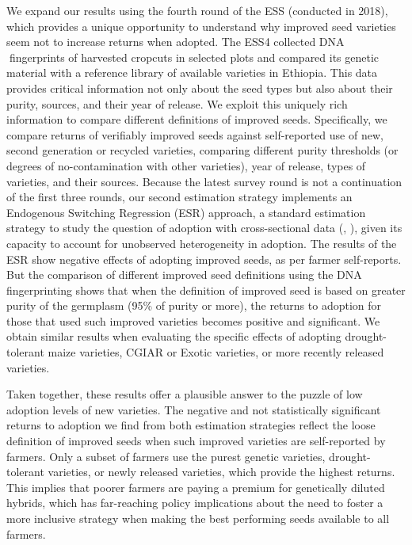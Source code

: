 \documentclass[11pt]{article}
\begin{document}
We expand our results using the fourth round of the ESS (conducted in 2018), which provides
a unique opportunity to understand why improved seed varieties seem not to increase returns
when adopted. The ESS4 collected DNA fingerprints of harvested cropcuts in selected plots and compared its genetic material with a reference library of available varieties in Ethiopia. This data provides critical information not only about the seed types but also about their purity, sources, and their year of release. We exploit this uniquely rich information to compare different definitions of improved seeds. Specifically, we compare returns of verifiably improved seeds against self-reported use of new, second generation or recycled varieties, comparing different purity thresholds (or degrees of no-contamination with other varieties), year of release, types of varieties, and their sources. Because the latest survey round is not a continuation of the first three rounds, our second estimation strategy implements an Endogenous Switching Regression (ESR) approach, a standard estimation strategy to study the question of adoption with cross-sectional data (\citealt{Marenya2020-kb}, \citealt{Shiferaw2014-op}), given its capacity to account for unobserved heterogeneity in adoption. The results of the ESR show negative effects of adopting improved seeds, as per farmer self-reports. But the comparison of different improved seed definitions using the DNA fingerprinting shows that when the definition of improved seed is based on greater purity of the germplasm (95\% of purity or more), the returns to adoption for those that used such improved varieties becomes positive and significant. We obtain similar results when evaluating the specific effects of adopting drought-tolerant maize varieties, CGIAR or Exotic varieties, or more recently released varieties.

Taken together, these results offer a plausible answer to the puzzle of low adoption levels of new varieties. The negative and not statistically significant returns to adoption we find from both estimation strategies reflect the loose definition of improved seeds when such improved varieties are self-reported by farmers. Only a subset of farmers use the purest genetic varieties, drought-tolerant varieties, or newly released varieties, which provide the highest returns. This implies that poorer farmers are paying a premium for genetically diluted hybrids, which has far-reaching policy implications about the need to foster a more inclusive strategy when making the best performing seeds available to all farmers.
\end{document}
